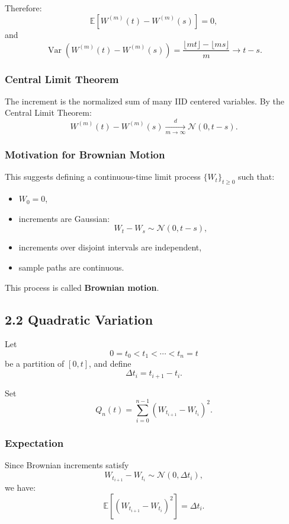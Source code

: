 \documentclass[11pt]{article}
\begin{document}
Therefore:
\[
\mathbb E[W^{(m)}(t)-W^{(m)}(s)]=0,
\]
and
\[
\operatorname{Var}(W^{(m)}(t)-W^{(m)}(s))
=
\frac{\lfloor mt\rfloor-\lfloor ms\rfloor}{m}\to t-s.
\]

\subsubsection*{Central Limit Theorem}

The increment is the normalized sum of many IID centered variables. By the Central Limit Theorem:
\[
W^{(m)}(t)-W^{(m)}(s)\xrightarrow[m\to\infty]{d}\mathcal N(0,t-s).
\]

\subsubsection*{Motivation for Brownian Motion}

This suggests defining a continuous-time limit process $\{W_t\}_{t\ge0}$ such that:

\begin{itemize}
    \item $W_0=0$,
    \item increments are Gaussian:
    \[
    W_t-W_s\sim\mathcal N(0,t-s),
    \]
    \item increments over disjoint intervals are independent,
    \item sample paths are continuous.
\end{itemize}

This process is called \textbf{Brownian motion}.


\subsection*{2.2 Quadratic Variation}

Let
\[
0=t_0<t_1<\cdots<t_n=t
\]
be a partition of $[0,t]$, and define
\[
\Delta t_i=t_{i+1}-t_i.
\]

Set
\[
Q_n(t)=\sum_{i=0}^{n-1}(W_{t_{i+1}}-W_{t_i})^2.
\]

\subsubsection*{Expectation}

Since Brownian increments satisfy
\[
W_{t_{i+1}}-W_{t_i}\sim\mathcal N(0,\Delta t_i),
\]
we have:
\[
\mathbb E[(W_{t_{i+1}}-W_{t_i})^2]=\Delta t_i.
\]
\end{document}
